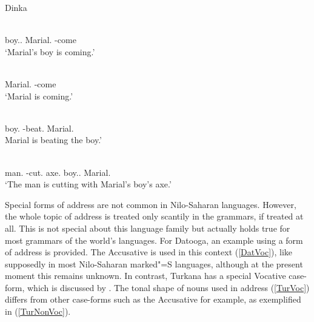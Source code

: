 \begin{exe}
\ex\label{DinGen} {Dinka} \citep[Nilotic; Sudan; ][273]{Andersen:1991}\nopagebreak[4]
\begin{xlist}
\ex\gll{}  \textbf{} \\
boy.\antgen{}.\acc{} \partic{} Marial.\nom{} \decl{}-come\\
`Marial's boy is coming.'

\ex\gll{} \\
 Marial.\acc{} \decl{}-come\\
`Marial is coming.'

\ex\gll{}  \\
 boy.\acc{} \decl{}-beat.\nts{} Marial.\nom{}\\
 Marial is beating the boy.'
 
\ex\gll{}      \textbf{} \\
man.\acc{} \decl{}-cut.\antip{} \prep{} axe.\antgen{} \partic{} boy.\antgen{}.\nom{} \partic{} Marial.\nom{}\\
`The man is cutting with Marial's boy's axe.' 
\end{xlist}
\end{exe}

Special forms of address are not common in Nilo-Saharan languages. 
However, the whole topic of address is treated only scantily in the grammars, if treated at all.
This is not special about this language family but actually holds true for most grammars of the world's languages.
For Datooga, an example using a form of address is provided. 
The Accusative is used in this context (\ref{DatVoc}), like supposedly in most Nilo-Saharan marked"=S languages, although at the present moment this remains unknown. 
In contrast, Turkana has a special Vocative case-form, which is discussed by \citet[67, 268--269]{Dimmendaal:1982}.
The tonal shape of nouns used in address (\ref{TurVoc}) differs from other case-forms such as the Accusative for example, as exemplified in (\ref{TurNonVoc}).

